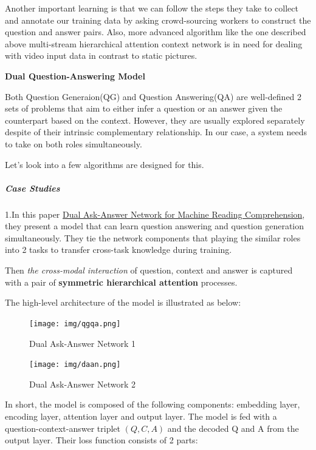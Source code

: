 \documentclass{acm_proc_article-sp}
\renewcommand{\paragraph}[1]{\vskip 6pt\noindent\textbf{#1 }}
\begin{document}
Another important learning is that we can follow the steps they take to
collect and annotate our training data by asking crowd-sourcing workers
to construct the question and answer pairs. Also, more advanced
algorithm like the one described above multi-stream hierarchical
attention context network is in need for dealing with video input data
in contrast to static pictures.

\paragraph{Dual Question-Answering
Model}\label{dual-question-answering-model}

Both Question Generaion(QG) and Question Answering(QA) are well-defined
2 sets of problems that aim to either infer a question or an answer
given the counterpart based on the context. However, they are usually
explored separately despite of their intrinsic complementary
relationship. In our case, a system needs to take on both roles
simultaneously.

Let's look into a few algorithms are designed for this.

\subparagraph{Case Studies}\label{case-studies-2}

1.In this paper \href{https://arxiv.org/pdf/1809.01997.pdf}{Dual
Ask-Answer Network for Machine Reading Comprehension}, they present a
model that can learn question answering and question generation
simultaneously. They tie the network components that playing the similar
roles into 2 tasks to transfer cross-task knowledge during training.

Then \emph{the cross-modal interaction} of question, context and answer
is captured with a pair of \textbf{symmetric hierarchical attention}
processes.

The high-level architecture of the model is illustrated as below:

\begin{figure}
\centering
\texttt{[image: img/qgqa.png]}
\caption{Dual Ask-Answer Network 1}
\end{figure}

\begin{figure}
\centering
\texttt{[image: img/daan.png]}
\caption{Dual Ask-Answer Network 2}
\end{figure}

In short, the model is composed of the following components: embedding
layer, encoding layer, attention layer and output layer. The model is
fed with a question-context-answer triplet \((Q,C,A)\) and the decoded Q
and A from the output layer. Their loss function consists of 2 parts:
\end{document}
